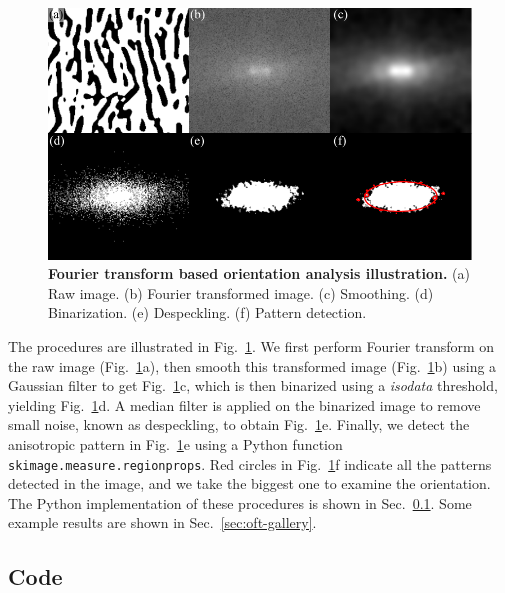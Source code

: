 \begin{figure}[h]
	\begin{center}
	\includegraphics[width=5.5in]{Figs/A-2/orientationFT.pdf}
	\end{center}
	\caption[Fourier Transform Based Orientation Analysis Illustration]
	{
	\textbf{Fourier transform based orientation analysis illustration.}
  (a) Raw image.
  (b) Fourier transformed image.
  (c) Smoothing.
  (d) Binarization.
  (e) Despeckling.
  (f) Pattern detection.
	}
	\label{fig:oft-illustration}
\end{figure}

The procedures are illustrated in Fig.~\ref{fig:oft-illustration}. We first perform Fourier transform on the raw image (Fig.~\ref{fig:oft-illustration}a), then smooth this transformed image (Fig.~\ref{fig:oft-illustration}b) using a Gaussian filter to get Fig.~\ref{fig:oft-illustration}c, which is then binarized using a \emph{isodata} threshold, yielding Fig.~\ref{fig:oft-illustration}d. A median filter is applied on the binarized image to remove small noise, known as despeckling, to obtain Fig.~\ref{fig:oft-illustration}e. Finally, we detect the anisotropic pattern in Fig.~\ref{fig:oft-illustration}e using a Python function \texttt{skimage.measure.regionprops}. Red circles in Fig.~\ref{fig:oft-illustration}f indicate all the patterns detected in the image, and we take the biggest one to examine the orientation. The Python implementation of these procedures is shown in Sec.~\ref{sec:oft-code}. Some example results are shown in Sec.~\ref{sec:oft-gallery}.

\subsection{Code}
\label{sec:oft-code}

